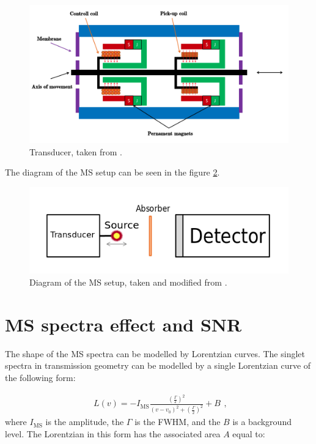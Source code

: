 \begin{figure}[H]
 \centering
 \includegraphics[scale=0.4, angle = 0]{./pictures/transducer}
 \caption{Transducer, taken from \cite{STEJSKAL2019thesis}.}
 \label{transducer}
 
\end{figure}


The diagram of the MS setup can be seen in the figure \ref{diagram}.

\begin{figure}[H]
 \centering
 \includegraphics[scale=0.8, angle = 0]{./pictures/MSsetup.png}
 \caption{Diagram of the MS setup, taken and modified from \cite{NOVAK2016thesis}.}
 \label{diagram}
 
\end{figure}


\section{MS spectra effect and SNR}
The shape of the MS spectra can be modelled by Lorentzian curves. The singlet spectra in transmission geometry can be modelled by a single Lorentzian curve of the following form:

\begin{equation}
\begin{aligned}
L(v) = -I_{\textrm{MS}}\frac{(\frac{\Gamma}{2})^2}{(v - v_0)^2 + (\frac{\Gamma}{2})^2} + B
\end{aligned},
\label{lor}
\end{equation}
where $I_{\textrm{MS}}$ is the amplitude, the $\Gamma$ is the FWHM, and the $B$ is a background level. The Lorentzian in this form has the associated area $A$ equal to:

